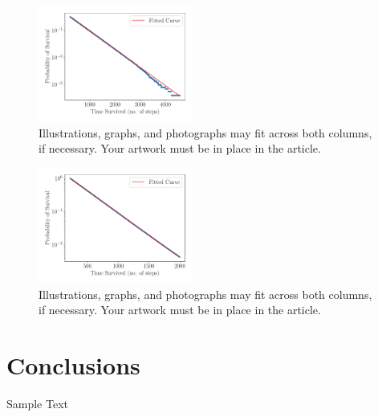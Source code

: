 \documentclass[journal]{IEEEtran}
\begin{document}
\begin{figure}[H]%
  \begin{center}
    \includegraphics[width=0.45\textwidth]{images/cum_line_plot.pdf}
    \caption{Illustrations, graphs, and photographs may fit across both columns, if necessary. Your artwork must be in place in the article.}
    \label{fig:cum_line_plot}
  \end{center}
\end{figure}


\begin{figure}[H]%
  \begin{center}
    \includegraphics[width=0.45\textwidth]{images/cum_line_plot_cutoff.pdf}
    \caption{Illustrations, graphs, and photographs may fit across both columns, if necessary. Your artwork must be in place in the article.}
    \label{fig:cum_line_cutoff_plot}
  \end{center}
\end{figure}

\section{Conclusions}

Sample Text


\end{document}
